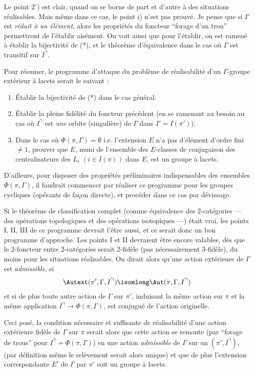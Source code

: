 Le point $2^\circ$) est clair, quand on se borne de part et d'autre à des situations réalisables. Mais même dans ce cas, le point i) n'est pas prouvé. Je pense que si $I'$ est \emph{réduit à un élément}, alors les propriétés du foncteur ``forage d'un trou'' permettront de l'établir aisément. On voit aussi que pour l'établir, on est ramené à établir la bijectivité de (*), et le théorème d'équivalence dans le cas où $\Gamma$ est transitif sur $I^{'!}$.  

Pour résumer, le programme d'attaque du problème de réalisabilité d'un $\Gamma$-groupe extérieur à lacets serait le suivant :
\begin{enumerate}
    \item[I)] Établir la bijectivité de (*) dans le cas général. 
    \item[II)] Établir la pleine fidélité du foncteur précédent (en se ramenant au besoin au cas où $I^{'!}$ est \emph{une} orbite (singulière) de $\Gamma$ dans $I' = I(\pi')$).
    \item[III)] Dans le cas où $\Phi(\pi, \Gamma) = \emptyset$ i.e. l'extension $E$ n'a pas d'élément d'ordre fini $\neq 1$, prouver que $E$, muni de l'ensemble des $E$-classes de conjugaison des centralisateurs des $L_i$ $(i \in I (\pi))$ dans $E$, est un groupe à lacets.
\end{enumerate}

D'ailleurs, pour disposer des propriétés préliminaires indispensables des ensembles   $\Phi (\pi, \Gamma)$, il faudrait commencer par réaliser ce programme pour les groupes cycliques (opérants de fa\c{c}on directe), et procéder dans ce cas par dévissage.

Si le théorème de classification complet (comme équivalence des 2-catégories --- des opérations topologiques et des opérations isotopiques ---) était vrai, les points I, II, III de ce programme devrait l'être aussi, et ce serait donc un bon programme d'approche. Les points I et II devraient être encore valables, dès que le 2-foncteur entre 2-catégories serait 2-fidèle (pas nécessairement 3-fidèle), du moins pour les situations réalisables. On dirait alors qu'une action extérieure de $\Gamma$ est \emph{admissible}, si
$$
\Autext (\pi', \Gamma, I^{'!}) \isomlong \Aut (\pi, \Gamma, I^{'!})
$$
et si de plus toute autre action de $\Gamma$ sur $\pi'$, induisant la même action sur $\pi$ et la même application $I^{'!} \to \Phi (\pi, \Gamma)$, est conjugué de l'action originelle.

Ceci posé, la condition nécessaire et suffisante de réalisabilité d'une action extérieure fidèle de $\Gamma$ sur $\pi$ serait alors que cette action se remonte (par ``forage de trous'' pour $I^{'!} = \Phi(\pi, \Gamma)$) en une action \emph{admissible} de $\Gamma$ sur un $(\pi', I^{'!})$, (par définition même le relèvement serait alors unique) et que de plus l'extension correspondante $E'$ de $\Gamma$ par $\pi'$ soit un groupe à lacets.


